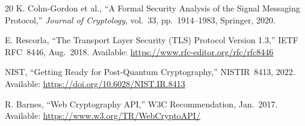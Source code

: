 \documentclass[11pt,a4paper]{article}
\begin{document}
\begin{thebibliography}{20}
K. Cohn-Gordon et al., ``A Formal Security Analysis of the Signal Messaging Protocol,'' \textit{Journal of Cryptology}, vol.~33, pp.~1914--1983, Springer, 2020.

E. Rescorla, ``The Transport Layer Security (TLS) Protocol Version 1.3,'' IETF RFC~8446, Aug.~2018. Available: \url{https://www.rfc-editor.org/rfc/rfc8446}

NIST, ``Getting Ready for Post-Quantum Cryptography,'' NISTIR~8413, 2022. Available: \url{https://doi.org/10.6028/NIST.IR.8413}

R. Barnes, ``Web Cryptography API,'' W3C Recommendation, Jan.~2017. Available: \url{https://www.w3.org/TR/WebCryptoAPI/}

\end{thebibliography}
\end{document}
